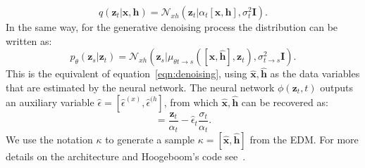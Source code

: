 \documentclass[journal=jacsat,manuscript=article]{achemso}
\begin{document}
\begin{equation}
    q(\mathbf{z}_t| \mathbf{x},\mathbf{h}) = \mathcal{N}_{xh}(\mathbf{z}_t|\alpha_t[\mathbf{x,h}],\sigma^2_t\mathbf{I}).
\end{equation}
In the same way, for the generative denoising process the distribution can be written as:
\begin{equation}
    p_\theta(\mathbf{z}_s| \mathbf{z}_t) = \mathcal{N}_{xh}(\mathbf{z}_s | \mu_{\theta t\rightarrow s}( [ \mathbf{\hat{x},\hat{h}}],\mathbf{z}_t),\sigma_{t\rightarrow s}^2\mathbf{I}).
\end{equation}
This is the equivalent of equation~\ref{eqn:denoising}, using $\mathbf{\hat{x}}, \mathbf{\hat{h}}$ as the data variables that are estimated by the neural network. The neural network $\phi(\mathbf{z}_t,t)$ outputs an auxiliary variable $\hat\epsilon = [\hat{\epsilon}^{(x)},\hat{\epsilon}^{(h}]$, from which $\mathbf{\hat{x}}, \mathbf{\hat{h}}$ can be recovered as:
\begin{equation}
    [\mathbf{\hat{x}}, \mathbf{\hat{h}}] = \frac{\mathbf{z}_t}{\alpha_t}-\hat{\epsilon}_t\frac{\sigma_t}{\alpha_t}.
\end{equation}
We use the notation $\kappa$ to generate a sample $\kappa = [\mathbf{\hat{x}}, \mathbf{\hat{h}}]$ from the EDM. 
For more details on the architecture and Hoogeboom's code see~\cite{hoogeboom2022equivariant}. 

\end{document}
